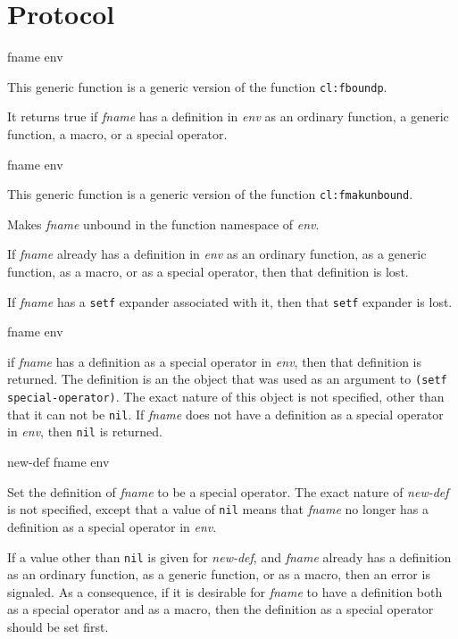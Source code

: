 \appendix

\section{Protocol}

 {fname env}

This generic function is a generic version of the \commonlisp{}
function \texttt{cl:fboundp}. 

It returns true if \textit{fname} has a definition in
\textit{env} as an ordinary function, a generic function, a
macro, or a special operator.

 {fname env}

This generic function is a generic version of the \commonlisp{}
function \texttt{cl:fmakunbound}.

Makes \textit{fname} unbound in the function namespace of
\textit{env}.

If \textit{fname} already has a definition in
\textit{env} as an ordinary function, as a generic function,
as a macro, or as a special operator, then that definition is lost.

If \textit{fname} has a \texttt{setf} expander associated with
it, then that \texttt{setf} expander is lost.

 {fname env}

if \textit{fname} has a definition as a special operator in
\textit{env}, then that definition is returned.  The definition is an
the object that was used as an argument to \texttt{(setf
  special-operator)}.  The exact nature of this object is not
specified, other than that it can not be \texttt{nil}.  If
\textit{fname} does not have a definition as a special operator in
\textit{env}, then \texttt{nil} is returned.

 {new-def fname env}

Set the definition of \textit{fname} to be a special operator.  The
exact nature of \textit{new-def} is not specified, except that a value
of \texttt{nil} means that \textit{fname} no longer has a definition
as a special operator in \textit{env}.

If a value other than \texttt{nil} is given for \textit{new-def}, and
\textit{fname} already has a definition as an ordinary function, as a
generic function, or as a macro, then an error is signaled.  As a
consequence, if it is desirable for \textit{fname} to have a
definition both as a special operator and as a macro, then the
definition as a special operator should be set first.

